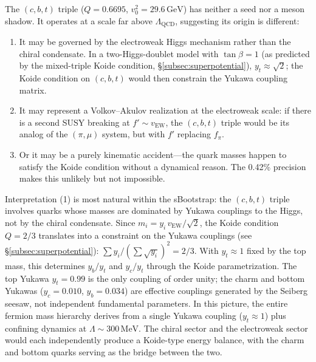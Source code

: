 \documentclass[12pt,a4paper]{article}
\newcommand{\MeV}{\,\text{MeV}}
\newcommand{\GeV}{\,\text{GeV}}
\begin{document}
The $(c,b,t)$ triple ($Q = 0.6695$, $v_0^2 = 29.6\GeV$) has 
neither a seed nor a meson shadow. It operates at a scale far 
above $\Lambda_{\text{QCD}}$, suggesting its origin is different:

\begin{enumerate}
\item It may be governed by the electroweak Higgs mechanism rather
than the chiral condensate. In a two-Higgs-doublet model with
$\tan\beta = 1$ (as predicted by the mixed-triple Koide condition,
\S\ref{subsec:superpotential}), $y_t \approx \sqrt{2}$;
the Koide condition on $(c,b,t)$ would then constrain the Yukawa
coupling matrix.
\item It may represent a Volkov--Akulov realization at the 
electroweak scale: if there is a second SUSY breaking at 
$f' \sim v_{\text{EW}}$, the $(c,b,t)$ triple would be its 
analog of the $(\pi, \mu)$ system, but with $f'$ replacing $f_\pi$.
\item Or it may be a purely kinematic accident---the quark masses 
happen to satisfy the Koide condition without a dynamical reason. 
The 0.42\% precision makes this unlikely but not impossible.
\end{enumerate}

Interpretation (1) is most natural within the sBootstrap: the
$(c,b,t)$ triple involves quarks whose masses are dominated by
Yukawa couplings to the Higgs, not by the chiral condensate.
Since $m_i = y_i\,v_{\text{EW}}/\sqrt{2}$, the Koide condition
$Q = 2/3$ translates into a constraint on the Yukawa couplings
(see \S\ref{subsec:superpotential}):
$\sum y_i/(\sum \sqrt{y_i})^2 = 2/3$.
With $y_t \approx 1$ fixed by the top mass, this determines
$y_b/y_t$ and $y_c/y_t$ through the Koide parametrization.
The top Yukawa $y_t = 0.99$ is the only coupling of order unity;
the charm and bottom Yukawas ($y_c = 0.010$, $y_b = 0.034$) are
effective couplings generated by the Seiberg seesaw, not independent
fundamental parameters.  In this picture, the entire fermion mass
hierarchy derives from a single Yukawa coupling ($y_t \approx 1$)
plus confining dynamics at $\Lambda \sim 300\MeV$.
The chiral sector and the electroweak sector would each
independently produce a Koide-type energy balance, with the charm
and bottom quarks serving as the bridge between the two.
\end{document}
